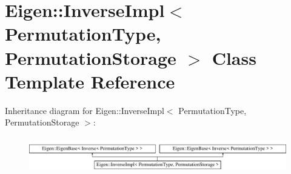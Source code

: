 \hypertarget{class_eigen_1_1_inverse_impl_3_01_permutation_type_00_01_permutation_storage_01_4}{}\section{Eigen\+:\+:Inverse\+Impl$<$ Permutation\+Type, Permutation\+Storage $>$ Class Template Reference}
\label{class_eigen_1_1_inverse_impl_3_01_permutation_type_00_01_permutation_storage_01_4}
Inheritance diagram for Eigen\+:\+:Inverse\+Impl$<$ Permutation\+Type, Permutation\+Storage $>$\+:\begin{figure}[H]
\begin{center}
\leavevmode
\includegraphics[height=1.559888cm]{class_eigen_1_1_inverse_impl_3_01_permutation_type_00_01_permutation_storage_01_4}
\end{center}
\end{figure}
